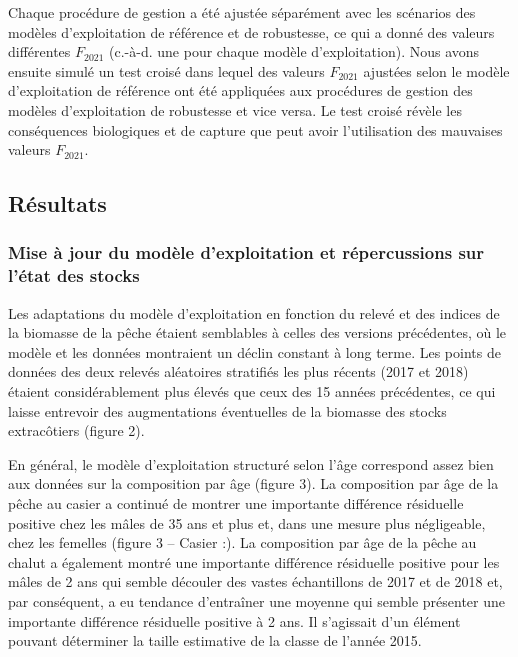 \documentclass[11pt]{book}
\begin{document}
Chaque procédure de gestion a été ajustée séparément avec les scénarios des modèles d'exploitation de référence et de robustesse, ce qui a donné des valeurs différentes \(F_{2021}\) (c.-à-d. une pour chaque modèle d'exploitation). Nous avons ensuite simulé un test croisé dans lequel des valeurs \(F_ {2021}\) ajustées selon le modèle d'exploitation de référence ont été appliquées aux procédures de gestion des modèles d'exploitation de robustesse et vice versa. Le test croisé révèle les conséquences biologiques et de capture que peut avoir l'utilisation des mauvaises valeurs \(F_{2021}\).

\hypertarget{ruxe9sultats}{%
\subsection{Résultats}\label{ruxe9sultats}}

\hypertarget{mise-uxe0-jour-du-moduxe8le-dexploitation-et-ruxe9percussions-sur-luxe9tat-des-stocks}{%
\subsubsection{Mise à jour du modèle d'exploitation et répercussions sur l'état des stocks}\label{mise-uxe0-jour-du-moduxe8le-dexploitation-et-ruxe9percussions-sur-luxe9tat-des-stocks}}

Les adaptations du modèle d'exploitation en fonction du relevé et des indices de la biomasse de la pêche étaient semblables à celles des versions précédentes, où le modèle et les données montraient un déclin constant à long terme. Les points de données des deux relevés aléatoires stratifiés les plus récents (2017 et 2018) étaient considérablement plus élevés que ceux des 15 années précédentes, ce qui laisse entrevoir des augmentations éventuelles de la biomasse des stocks extracôtiers (figure 2).

En général, le modèle d'exploitation structuré selon l'âge correspond assez bien aux données sur la composition par âge (figure 3). La composition par âge de la pêche au casier a continué de montrer une importante différence résiduelle positive chez les mâles de 35 ans et plus et, dans une mesure plus négligeable, chez les femelles (figure 3 -- Casier :). La composition par âge de la pêche au chalut a également montré une importante différence résiduelle positive pour les mâles de 2 ans qui semble découler des vastes échantillons de 2017 et de 2018 et, par conséquent, a eu tendance d'entraîner une moyenne qui semble présenter une importante différence résiduelle positive à 2 ans. Il s'agissait d'un élément pouvant déterminer la taille estimative de la classe de l'année 2015.
\end{document}
